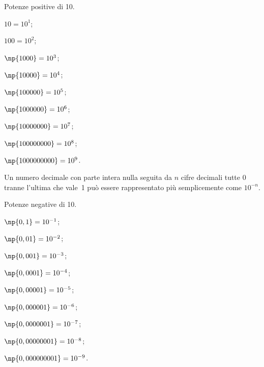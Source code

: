 \begin{exrig}
\begin{esempio}
 Potenze positive di 10.
\begin{multicols}{3}
\begin{enumeratea}
\item $10=10^1$;
\item $100=10^2$;
\item $\np{1000}=10^3$;
\item $\np{10000}=10^4$;
\item $\np{100000}=10^5$;
\item $\np{1000000}=10^6$;
\item $\np{10000000}=10^7$;
\item $\np{100000000}=10^8$;
\item $\np{1000000000}=10^9$.
\end{enumeratea}
\end{multicols}
\end{esempio}
\end{exrig}

\osservazione Un numero decimale con parte intera nulla seguita da $n$ cifre decimali tutte 0 tranne l'ultima che vale~1 può essere rappresentato più semplicemente come $10^{-n}$.

\begin{exrig}
\begin{esempio}
 Potenze negative di 10.
\begin{multicols}{3}
\begin{enumeratea}
\item $\np{0,1}=10^{-1}$;
\item $\np{0,01}=10^{-2}$;
\item $\np{0,001}=10^{-3}$;
\item $\np{0,0001}=10^{-4}$;
\item $\np{0,00001}=10^{-5}$;
\item $\np{0,000001}=10^{-6}$;
\item $\np{0,0000001}=10^{-7}$;
\item $\np{0,00000001}=10^{-8}$;
\item $\np{0,000000001}=10^{-9}$.
\end{enumeratea}
\end{multicols}

\end{esempio}
\end{exrig}

\ovalbox{\risolvii \ref{ese:3.66}, \ref{ese:3.67}, \ref{ese:3.68}, \ref{ese:3.69}, \ref{ese:3.70}, \ref{ese:3.71},
\ref{ese:3.72}, \ref{ese:3.73}}

